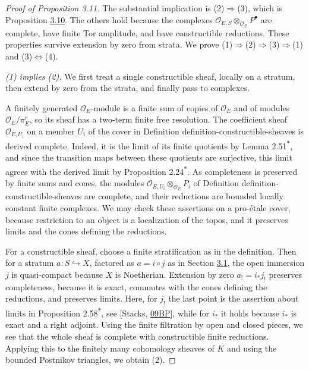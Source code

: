 \documentclass[11pt]{article}
\newcommand{\bpout}[1]{#1\textsuperscript{\hyperlink{bp-outside}{\ensuremath{\ast}}}}
\begin{document}
\begin{proof}[{Proof of Proposition 3.11}]\label{bp36}%
The substantial implication is (2)\(\Rightarrow\)(3), which is Proposition \hyperref[bp31]{3.10}. The others hold because the complexes \(\mathcal O_{E,S}\otimes_{\mathcal O_E}P^\bullet\) are complete, have finite Tor amplitude, and have constructible reductions. These properties survive extension by zero from strata. We prove (1)\(\Rightarrow\)(2)\(\Rightarrow\)(3)\(\Rightarrow\)(1) and (3)\(\Leftrightarrow\)(4).

\emph{(1) implies (2).} We first treat a single constructible sheaf, locally on a stratum, then extend by zero from the strata, and finally pass to complexes.

A finitely generated \(\mathcal O_E\)-module is a finite sum of copies of \(\mathcal O_E\) and of modules \(\mathcal O_E/\pi_E^r\), so its sheaf has a two-term finite free resolution. The coefficient sheaf \(\mathcal O_{E,U_i}\) on a member \(U_i\) of the cover in Definition definition-constructible-sheaves is derived complete. Indeed, it is the limit of its finite quotients by Lemma \bpout{2.51}, and since the transition maps between these quotients are surjective, this limit agrees with the derived limit by Proposition \bpout{2.24}. As completeness is preserved by finite sums and cones, the modules \(\mathcal O_{E,U_i}\otimes_{\mathcal O_E}P_i\) of Definition definition-constructible-sheaves are complete, and their reductions are bounded locally constant finite complexes. We may check these assertions on a pro-étale cover, because restriction to an object is a localization of the topos, and it preserves limits and the cones defining the reductions.

For a constructible sheaf, choose a finite stratification as in the definition. Then for a stratum \(a:S\hookrightarrow X\), factored as \(a=i\circ j\) as in Section \hyperref[bp3]{3.1}, the open immersion \(j\) is quasi-compact because \(X\) is Noetherian. Extension by zero \(a_!=i_*j_!\) preserves completeness, because it is exact, commutes with the cones defining the reductions, and preserves limits. Here, for \(j_!\) the last point is the assertion about limits in Proposition \bpout{2.58}, see [Stacks, \href{https://stacks.math.columbia.edu/tag/09BP}{09BP}], while for \(i_*\) it holds because \(i_*\) is exact and a right adjoint. Using the finite filtration by open and closed pieces, we see that the whole sheaf is complete with constructible finite reductions. Applying this to the finitely many cohomology sheaves of \(K\) and using the bounded Postnikov triangles, we obtain (2).


\end{proof}
\end{document}
